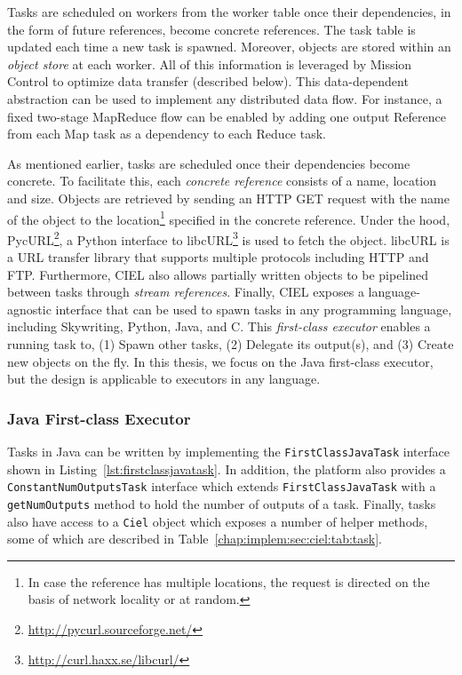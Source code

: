 \documentclass[a4paper,12pt,twoside,openright]{report}
\begin{document}
Tasks are scheduled on workers from the worker table once their dependencies, in
the form of future references, become concrete references. The task table is
updated each time a new task is spawned. Moreover, objects are stored within an
\emph{object store} at each worker. All of this information is leveraged by
Mission Control to optimize data transfer (described below). This data-dependent
abstraction can be used to implement any distributed data flow. For instance, a
fixed two-stage MapReduce flow can be enabled by adding one output Reference
from each Map task as a dependency to each Reduce task. 

As mentioned earlier, tasks are scheduled once their dependencies become
concrete. To facilitate this, each \emph{concrete reference} consists of a name,
location and size. Objects are retrieved by sending an HTTP GET request with the
name of the object to the location\footnote{In case the reference has multiple
locations, the request is directed on the basis of network locality or at
random.} specified in the concrete reference. Under the hood,
PycURL\footnote{\url{http://pycurl.sourceforge.net/}}, a Python interface to
libcURL\footnote{\url{http://curl.haxx.se/libcurl/}} is used to fetch the
object. libcURL is a URL transfer library that supports multiple protocols
including HTTP and FTP. Furthermore, CIEL also allows partially written objects
to be pipelined between tasks through \emph{stream references}. Finally, CIEL
exposes a language-agnostic interface that can be used to spawn tasks in any
programming language, including Skywriting, Python, Java, and C. This
\emph{first-class executor} enables a running task to, (1) Spawn other tasks,
(2) Delegate its output(s), and (3) Create new objects on the fly.
In this thesis, we focus on the Java first-class executor, but the design is
applicable to executors in any language.

\subsubsection{Java First-class Executor}
Tasks in Java can be written by implementing the \texttt{FirstClassJavaTask}
interface shown in Listing~\ref{lst:firstclassjavatask}. In addition, the
platform also provides a \texttt{ConstantNumOutputsTask} interface which extends
\texttt{FirstClassJavaTask} with a \texttt{getNumOutputs} method to hold the
number of outputs of a task. Finally, tasks also have access to a \texttt{Ciel}
object which exposes a number of helper methods, some of which are described in
Table~\ref{chap:implem:sec:ciel:tab:task}.
\end{document}
